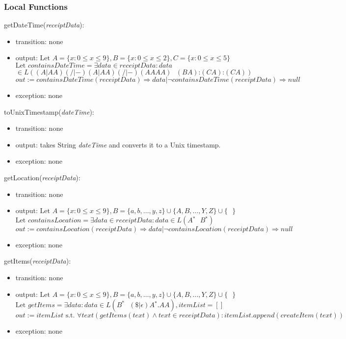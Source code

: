 \documentclass[12pt, titlepage]{article}
\begin{document}
\subsubsection{Local Functions}

\noindent getDateTime(\textit{receiptData}):
\begin{itemize}
  \item transition: none
  \item output: $\text{Let } A=\{x : 0 \leq x \leq 9\}, B=\{x : 0 \leq x \leq 2\}, C=\{x : 0 \leq x \leq 5\}$ \\
                $\text{Let } containsDateTime=\exists data \in receiptData : data$\\ $\in L((A|AA)(/|-)(A|AA)(/|-)(AAAA)\text{ }(BA)\text{:}(CA)\text{:}(CA))$ \\
                $out := containsDateTime(receiptData) \Rightarrow data | \neg containsDateTime(receiptData) \Rightarrow null$
  \item exception: none
\end{itemize}

\noindent toUnixTimestamp(\textit{dateTime}):
\begin{itemize}
  \item transition: none
  \item output: takes String \textit{dateTime} and converts it to a Unix timestamp.
  \item exception: none
\end{itemize}

\noindent getLocation(\textit{receiptData}):
\begin{itemize}
  \item transition: none
  \item output: $\text{Let } A=\{x : 0 \leq x \leq 9\}, B=\{a,b,\dots,y,z\}\cup\{A,B,\dots,Y,Z\}\cup\{\text{ }\}$ \\
                $\text{Let } containsLocation=\exists data \in receiptData : data \in L(A{}^\ast \text{ } B{}^\ast)$ \\
                $out := containsLocation(receiptData) \Rightarrow data | \neg containsLocation(receiptData) \Rightarrow null$
  \item exception: none
\end{itemize}

\noindent getItems(\textit{receiptData}):
\begin{itemize}
  \item transition: none
  \item output: $\text{Let } A=\{x : 0 \leq x \leq 9\}, B=\{a,b,\dots,y,z\}\cup\{A,B,\dots,Y,Z\}\cup\{\text{ }\}$ \\
                $\text{Let } getItems=\exists data : data \in L(B^\ast \text{ } (\$|\epsilon)A{}^\ast.AA), itemList=[]$ \\
                $out := itemList \text{ s.t. } \forall text(getItems(text) \land text \in receiptData) : itemList.append(createItem(text))$
  \item exception: none
\end{itemize}
\end{document}
